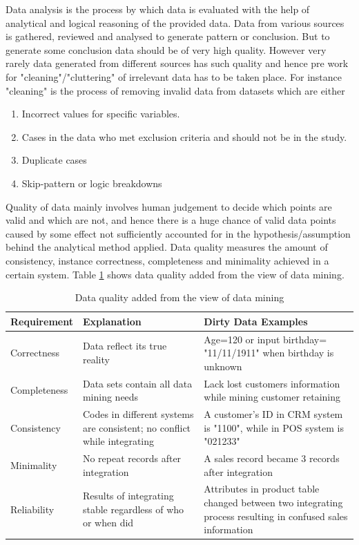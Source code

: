 \documentclass[article,type=msc,colorback,accentcolor=tud9c,twoside,11pt]{tudthesis}
\begin{document}
	Data analysis is the process by which data is evaluated with the help of analytical and logical reasoning of the provided data. Data from various sources is gathered, reviewed and analysed to generate pattern or conclusion. But to generate some conclusion data should be of very high quality. However very rarely data generated from different sources has such quality and hence pre work for "cleaning"/"cluttering" of irrelevant data has to be taken place. For instance "cleaning" is the process of removing invalid data from datasets which are either
	\begin{enumerate}
		\item Incorrect values for specific variables.
		\item Cases in the data who met exclusion criteria and should not be in the study.
		\item Duplicate cases
		\item Skip-pattern or logic breakdowns
	\end{enumerate}
	Quality of data mainly involves human judgement to decide which points are valid and which are not, and hence there is a huge chance of valid data points caused by some effect not sufficiently accounted for in the hypothesis/assumption behind the analytical method applied. Data quality measures the amount of consistency, instance correctness, completeness and minimality achieved in a certain system. Table \ref{DataQuality} \cite{Dataquality} shows data quality added from the view of data mining.
	
	\begin{table}[H]
		\centering
		\begin{tabular}{|p{3cm}|p{5cm}|p{7cm}|}
			\hline
			\textbf{Requirement} & \textbf{Explanation} & \textbf{Dirty Data Examples} 
			\\ \hline
			Correctness   & Data reflect its true reality             & Age=120 or input birthday= "11/11/1911" when birthday is unknown\\ \hline
			
			Completeness   & Data sets contain all data mining needs & Lack lost customers information while mining customer retaining\\ \hline
			
			Consistency  & Codes in different systems are consistent; no conflict while
			integrating  & A customer’s ID in CRM system is "1100", while in POS system is "021233"\\ \hline
			
			Minimality  & No repeat records after integration  &A sales record became 3 records after integration\\ \hline
			
			Reliability  & Results of integrating stable regardless of who or when did  & Attributes in product table changed between two integrating process resulting in confused sales information\\ \hline		
		\end{tabular}
		\caption{Data quality added from the view of data mining}
		\label{DataQuality}
	\end{table}
	
\end{document}
